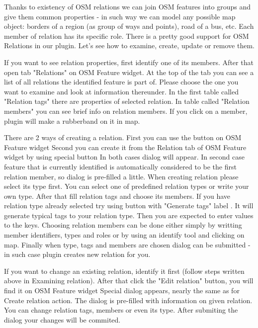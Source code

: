 
Thanks to existency of OSM relations we can join OSM features into groups and
give them common properties - in such way we can model any possible map
object: borders of a region (as group of ways and points), road of a bus,
etc. Each member of relation has its specific role.
There is a pretty good support for OSM Relations in our plugin.
Let's see how to examine, create, update or remove them.


If you want to see relation properties, first identify one of its members.
After that open tab "Relations" on OSM Feature widget. At the top of the tab
you can see a list of all relations the identified feature is part of. Please
choose the one you want to examine and look at information thereunder.
In the first table called "Relation tags" there are properties of selected
relation.
In table called "Relation members" you can see brief info on relation
members.
If you click on a member, plugin will make a rubberband on it in map.


There are 2 ways of creating a relation.
First you can use the button on OSM Feature widget   
Second you can create it from the Relation tab of OSM Feature widget by using
special button   
In both cases dialog will appear. In second case feature that is currently
identified is automatically considered to be the first relation member, so
dialog is pre-filled a little.
When creating relation please select its type first. You can select one of
predefined relation types or write your own type. After that fill relation
tags and choose its members.
If you have relation type already selected try using button with "Generate
tags" label  . It will generate typical tags to your relation type. Then you
are expected to enter values to the keys.
Choosing relation members can be done either simply by writting member
identifiers, types and roles or by using an identify tool      and clicking
on map.
Finally when type, tags and members are chosen dialog can be submitted - in
such case plugin creates new relation for you.


If you want to change an existing relation, identify it first (follow steps
written above in Examining relation). After that click the "Edit relation"
button, you will find it on OSM Feature widget   
Special dialog appears, nearly the same as for Create relation action.
The dialog is pre-filled with information on given relation. You can change
relation tags, members or even its type. After submiting the dialog your
changes will be commited.

